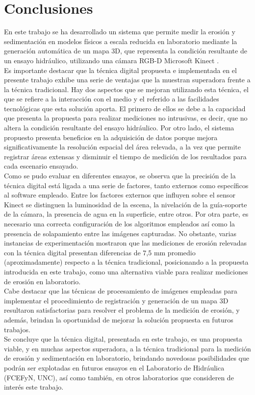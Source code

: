 \chapter{Conclusiones}

En este trabajo se ha desarrollado un sistema que permite medir la erosión y sedimentación en modelos físicos a escala reducida en laboratorio mediante la generación automática de un mapa 3D, que representa la condición resultante de un ensayo hidráulico, utilizando una cámara RGB-D Microsoft Kinect \cite{microsoft-kinect}. \\
Es importante destacar que la técnica digital propuesta e implementada en el presente trabajo exhibe una serie de ventajas que la muestran superadora frente a la técnica tradicional. Hay dos aspectos que se mejoran utilizando esta técnica, el que se refiere a la interacción con el medio y el referido a las facilidades tecnológicas que esta solución aporta. El primero de ellos se debe a la capacidad que presenta la propuesta para realizar mediciones no intrusivas, es decir, que no altera la condición resultante del ensayo hidráulico. Por otro lado, el sistema propuesto presenta beneficios en la adquisición de datos porque mejora significativamente la resolución espacial del área relevada, a la vez que permite registrar áreas extensas y disminuir el tiempo de medición de los resultados para cada escenario ensayado. \\
Como se pudo evaluar en diferentes ensayos, se observa que la precisión de la técnica digital está ligada a una serie de factores, tanto externos como específicos al software empleado. Entre los factores externos que influyen sobre el sensor Kinect se distinguen la luminosidad de la escena, la nivelación de la guía-soporte de la cámara, la presencia de agua en la superficie, entre otros. Por otra parte, es necesario una correcta configuración de los algoritmos empleados así como la presencia de solapamiento entre las imágenes capturadas. No obstante, varias instancias de experimentación mostraron que las mediciones de erosión relevadas con la técnica digital presentan diferencias de 7,5 mm promedio (aproximadamente) respecto a la técnica tradicional, posicionando a la propuesta introducida en este trabajo, como una alternativa viable para realizar mediciones de erosión en laboratorio. \\
Cabe destacar que las técnicas de procesamiento de imágenes empleadas para implementar el procedimiento de registración y generación de un mapa 3D  resultaron satisfactorias para resolver el problema de la medición de erosión, y además, brindan la oportunidad de mejorar la solución propuesta en futuros trabajos. \\
Se concluye que la técnica digital, presentada en este trabajo, es una propuesta viable, y en muchas aspectos superadora, a la técnica tradicional para la medición de erosión y sedimentación en laboratorio, brindando novedosas posibilidades que podrán ser explotadas en futuros ensayos en el Laboratorio de Hidráulica (FCEFyN, UNC), así como también, en otros laboratorios que consideren de interés este trabajo.